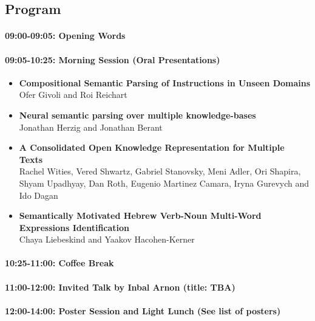 \documentclass[a0,portrait]{a0poster}
\begin{document}
\subsection*{Program}\label{program}

\paragraph{09:00-09:05: Opening Words}\label{opening-words}

\paragraph{09:05-10:25: Morning Session (Oral
Presentations)}\label{morning-session-oral-presentations}

\begin{itemize}
\item
  \textbf{Compositional Semantic Parsing of Instructions in Unseen
  Domains}\\
  Ofer Givoli and Roi Reichart
\item
  \textbf{Neural semantic parsing over multiple knowledge-bases}\\
  Jonathan Herzig and Jonathan Berant
\item
  \textbf{A Consolidated Open Knowledge Representation for Multiple
  Texts}\\
  Rachel Wities, Vered Shwartz, Gabriel Stanovsky, Meni Adler, Ori
  Shapira, Shyam Upadhyay, Dan Roth, Eugenio Martinez Camara, Iryna
  Gurevych and Ido Dagan
\item
  \textbf{Semantically Motivated Hebrew Verb-Noun Multi-Word Expressions
  Identification}\\
  Chaya Liebeskind and Yaakov Hacohen-Kerner
\end{itemize}

\paragraph{10:25-11:00: Coffee Break}\label{coffee-break}

\paragraph{11:00-12:00: Invited Talk by Inbal Arnon (title:
TBA)}\label{invited-talk-by-inbal-arnon-title-tba}

\paragraph{12:00-14:00: Poster Session and Light Lunch (See list of posters)}\label{poster-session-and-light-lunch-see-list-of-posters}
\end{document}
